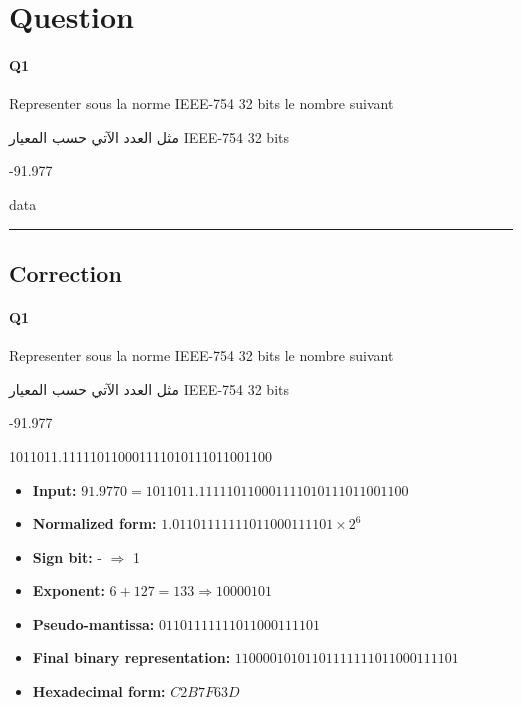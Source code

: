 
\section{Question}


\paragraph{Q1}

Representer sous la norme IEEE-754 32 bits le nombre suivant

\begin{arab}[utf]
مثل العدد الآتي حسب المعيار IEEE-754 32 bits
\end{arab}

-91.977

data


\hrule width 1\linewidth
\pagebreak

\subsection{Correction}


\paragraph{Q1}

Representer sous la norme IEEE-754 32 bits le nombre suivant

\begin{arab}[utf]
مثل العدد الآتي حسب المعيار IEEE-754 32 bits
\end{arab}

-91.977

\num{ 1011011.111110110001111010111011001100 }

\begin{itemize}
  \item \textbf{Input:} $91.9770 = \num{ 1011011.111110110001111010111011001100 }$
  \item \textbf{Normalized form:} $1.01101111111011000111101 \times 2^6$
  \item \textbf{Sign bit:} - $\Rightarrow$ 1
  \item \textbf{Exponent:} $6 + 127 = 133 \Rightarrow 10000101$
  \item \textbf{Pseudo-mantissa:} $01101111111011000111101$
  \item \textbf{Final binary representation:}  $11000010101101111111011000111101 $
  \item \textbf{Hexadecimal form:} $ C2B7F63D $
  \end{itemize}

